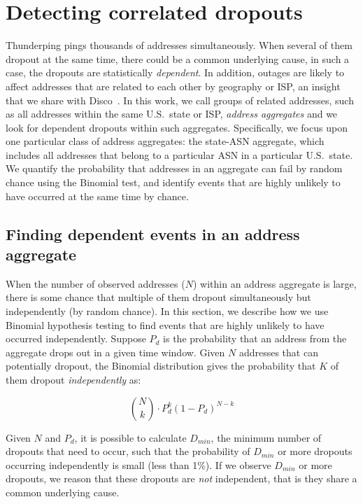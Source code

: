 \section{Detecting correlated dropouts}
\label{sec:method}

Thunderping pings thousands of addresses simultaneously. When
several of them dropout at the same time, there could be a common
underlying cause, in such a case, the dropouts are statistically
\emph{dependent}.
%
In addition, outages are likely to affect addresses that are related to
each other by geography or ISP, an insight that we share with
Disco~\cite{disco}. In this work, we call groups of related addresses, such as all addresses within the
same U.S.~state or ISP, \emph{address aggregates} and we look for
dependent dropouts within such aggregates. Specifically, we
focus upon one particular class of address aggregates: the state-ASN
aggregate, which includes all addresses that belong to a particular
ASN in a particular U.S.~state.
%
We quantify the probability that addresses in an aggregate can fail by
random chance using the Binomial test, and identify events that are
highly unlikely to have occurred at the same time by chance.

\subsection{Finding dependent events in an address aggregate}

When the number of observed addresses ($N$) within an address
aggregate is large, there is some chance that multiple of them
dropout simultaneously but independently (by random chance).
In this section, we describe how we use Binomial hypothesis testing to find events that
are highly unlikely to have occurred independently. Suppose $P_d$ is
the probability that an address from the aggregate drops out in a
given time window. Given
$N$ addresses that can potentially dropout, the Binomial distribution gives the probability that
$K$ of them dropout \emph{independently} as:

\[
{N\choose k} \cdot P_d^k(1-P_d)^{N-k}
\]

Given $N$ and $P_d$, it is possible to calculate $D_{min}$, the minimum number of
dropouts that need to occur, such that the probability of
$D_{min}$ or more dropouts occurring independently is small (less
than 1\%). If we observe $D_{min}$ or more dropouts, we reason that
these dropouts are \emph{not} independent, that is they share a common underlying cause.

